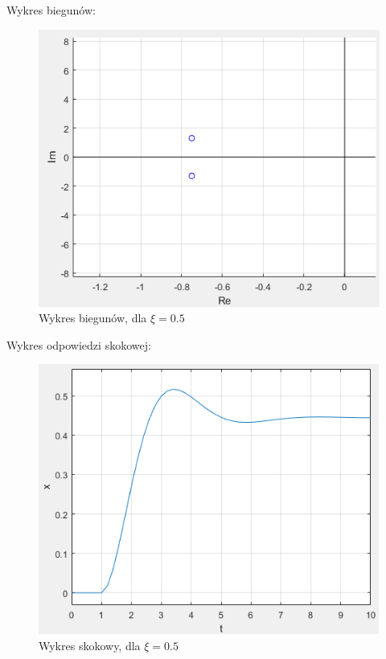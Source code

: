 \documentclass{article}
\begin{document}
\begin{flushleft}
  Wykres biegunów:\\
 \begin{figure}[h!]
    \centering
    \includegraphics[scale=0.6]{biegunyksi05.png}
    \caption{Wykres biegunów, dla $\xi=0.5$}
    \label{fig:bieguny_ksi_0_5}
 \end{figure}
 

 Wykres odpowiedzi skokowej:\\
 \begin{figure}[h!]
    \centering
    \includegraphics[scale=0.6]{skokksi05.png}
    \caption{Wykres skokowy, dla $\xi=0.5$}
    \label{fig:ksi_0_5}
 \end{figure}
 

\end{flushleft}
\end{document}

